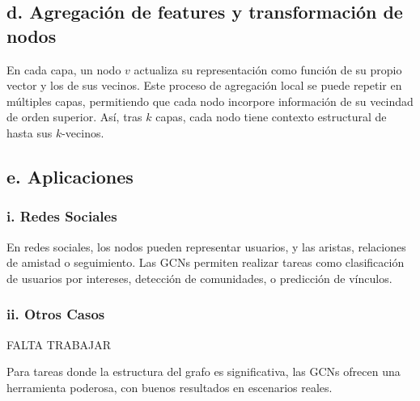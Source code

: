 \documentclass[11pt]{article} %
\begin{document}
\subsection*{d. Agregación de features y transformación de nodos}

En cada capa, un nodo $v$ actualiza su representación como función de su propio vector y los de sus vecinos. Este proceso de agregación local se puede repetir en múltiples capas, permitiendo que cada nodo incorpore información de su vecindad de orden superior. Así, tras $k$ capas, cada nodo tiene contexto estructural de hasta sus $k$-vecinos.

\subsection*{e. Aplicaciones}

\subsubsection*{i. Redes Sociales}

En redes sociales, los nodos pueden representar usuarios, y las aristas, relaciones de amistad o seguimiento. Las GCNs permiten realizar tareas como clasificación de usuarios por intereses, detección de comunidades, o predicción de vínculos.

\subsubsection*{ii. Otros Casos}
FALTA TRABAJAR

\vspace{1em}
\noindent Para tareas donde la estructura del grafo es significativa, las GCNs ofrecen una herramienta poderosa, con buenos resultados en escenarios reales.



\newpage
\nocite{*}
\printbibliography
\end{document}
